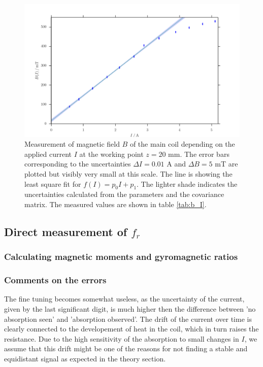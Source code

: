 \begin{figure}
\includegraphics[width=\textwidth]{figures/b_I.pdf}
\caption{   
    Measurement of magnetic field $B$ of the main coil depending on the applied current 
    $I$ at the working point $z = 20$ mm. The error bars corresponding 
    to the uncertainties $\Delta I = 0.01$ A 
    and $\Delta B = 5$ mT are plotted but visibly very small at this scale. 
    The line is showing the least square fit for $f(I) = p_0 I + p_1$. The 
    lighter shade indicates the uncertainties calculated from the parameters 
    and the covariance matrix. 
    The measured values are shown in table \ref{tab:b_I}.
    }
\label{fig:b_I}
\end{figure}


\subsection{Direct measurement of $f_r$}
\subsubsection{Calculating magnetic moments and gyromagnetic ratios}



\subsubsection{Comments on the errors}
The fine tuning becomes somewhat useless, as the uncertainty of the current, given by the last 
significant digit, is much higher then the difference between 'no absorption seen' and 
'absorption observed'. The drift of the current over time is clearly connected to the developement 
of heat in the coil, which in turn raises the resistance. Due to the high sensitivity of the absorption 
to small changes in $I$, we assume that this drift might be one of the reasons for not finding 
a stable and equidistant signal as expected in the theory section. 





